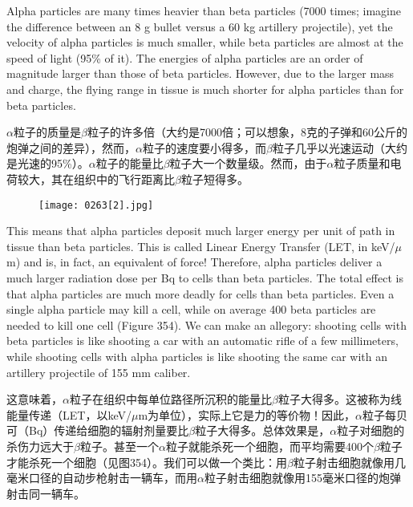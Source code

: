 \documentclass[dvipsnames, svgnames,a4paper,11pt]{article}
\begin{document}
Alpha particles are many times heavier than beta particles (7000 times; imagine the difference between an 8 g bullet versus a 60 kg artillery projectile), yet the velocity of alpha particles is much smaller, while beta particles are almost at the speed of light (95\% of it). The energies of alpha particles are an order of magnitude larger than those of beta particles. However, due to the larger mass and charge, the flying range in tissue is much shorter for alpha particles than for beta particles.  

$\alpha$粒子的质量是$\beta$粒子的许多倍（大约是7000倍；可以想象，8克的子弹和60公斤的炮弹之间的差异），然而，$\alpha$粒子的速度要小得多，而$\beta$粒子几乎以光速运动（大约是光速的95\%）。$\alpha$粒子的能量比$\beta$粒子大一个数量级。然而，由于$\alpha$粒子质量和电荷较大，其在组织中的飞行距离比$\beta$粒子短得多。  

\begin{figure}[h]
    \centering
    \texttt{[image: 0263[2].jpg]}
     \label{fig354}
\end{figure}

This means that alpha particles deposit much larger energy per unit of path in tissue than beta particles. This is called Linear Energy Transfer (LET, in keV/\(\mu\)m) and is, in fact, an equivalent of force! Therefore, alpha particles deliver a much larger radiation dose per Bq to cells than beta particles. The total effect is that alpha particles are much more deadly for cells than beta particles. Even a single alpha particle may kill a cell, while on average 400 beta particles are needed to kill one cell (Figure 354). We can make an allegory: shooting cells with beta particles is like shooting a car with an automatic rifle of a few millimeters, while shooting cells with alpha particles is like shooting the same car with an artillery projectile of 155 mm caliber.

这意味着，$\alpha$粒子在组织中每单位路径所沉积的能量比$\beta$粒子大得多。这被称为线能量传递（LET，以keV/\(\mu\)m为单位），实际上它是力的等价物！因此，$\alpha$粒子每贝可（Bq）传递给细胞的辐射剂量要比$\beta$粒子大得多。总体效果是，$\alpha$粒子对细胞的杀伤力远大于$\beta$粒子。甚至一个$\alpha$粒子就能杀死一个细胞，而平均需要400个$\beta$粒子才能杀死一个细胞（见图354）。我们可以做一个类比：用$\beta$粒子射击细胞就像用几毫米口径的自动步枪射击一辆车，而用$\alpha$粒子射击细胞就像用155毫米口径的炮弹射击同一辆车。
\end{document}
